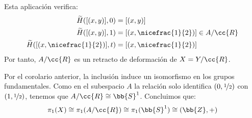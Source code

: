 \begin{ejemplo}
\begin{enumerate}
        Esta aplicación verifica:
        \begin{align*}
            \tilde{H}([(x,y)],0) &= [(x,y)]\\
            \tilde{H}([(x,y)],1) &= \left[\left(x, \nicefrac{1}{2}\right)\right]\in A/\cc{R}\\
            \tilde{H}([(x,\nicefrac{1}{2})],t) &= \left[\left(x, \nicefrac{1}{2}\right)\right]
        \end{align*}
        Por tanto, $A/\cc{R}$ es un retracto de deformación de $X = Y/\cc{R}$.

        Por el corolario anterior, la inclusión induce un isomorfismo en los grupos fundamentales. Como en el subespacio $A$ la relación solo identifica $(0, \nicefrac{1}{2})$ con $(1, \nicefrac{1}{2})$, tenemos que $A/\cc{R} \cong \bb{S}^1$. Concluimos que:
        \begin{gather*}
            \pi_1(X) \cong \pi_1(A/\cc{R}) \cong \pi_1(\bb{S}^1)\cong (\bb{Z},+)
        \end{gather*}
    \end{enumerate}
\end{ejemplo}

